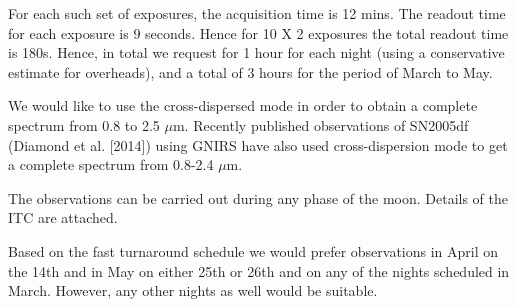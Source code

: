 \documentclass[11pt]{article}
\begin{document}
For each such set of  exposures, the acquisition time is 12 mins. The readout time for each exposure is 9 seconds. Hence for 10 X 2 exposures the total readout time is 180s. 
Hence, in total we request for 1 hour for each night (using a conservative estimate for overheads), and a total of 3 hours for the period of March to May. 

We would like to use the cross-dispersed mode in order to obtain a complete spectrum from 0.8 to 2.5 $\mu$m. Recently published observations of SN2005df (Diamond et al. [2014]) using GNIRS have also used cross-dispersion mode to get a complete spectrum from 0.8-2.4 $\mu$m.

The observations can be carried out during any phase of the moon. Details of the ITC are attached. 

Based on the fast turnaround schedule we would prefer observations in April on the 14th and in May on either 25th or 26th and on any of the nights scheduled in March. However, any other nights as well would be suitable. 
\bigskip



\bandthreeplan    %


\bigskip


\end{document}
